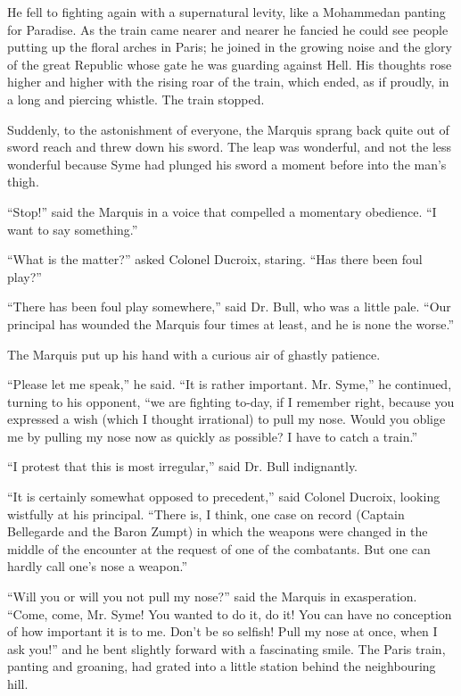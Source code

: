 \documentclass{book}
\begin{document}
He fell to fighting again with a supernatural levity, like a Mohammedan panting for Paradise. As the train came nearer and nearer he fancied he could see people putting up the floral arches in Paris; he joined in the growing noise and the glory of the great Republic whose gate he was guarding against Hell. His thoughts rose higher and higher with the rising roar of the train, which ended, as if proudly, in a long and piercing whistle. The train stopped.

Suddenly, to the astonishment of everyone, the Marquis sprang back quite out of sword reach and threw down his sword. The leap was wonderful, and not the less wonderful because Syme had plunged his sword a moment before into the man’s thigh.

“Stop!” said the Marquis in a voice that compelled a momentary obedience. “I want to say something.”

“What is the matter?” asked Colonel Ducroix, staring. “Has there been foul play?”

“There has been foul play somewhere,” said Dr. Bull, who was a little pale. “Our principal has wounded the Marquis four times at least, and he is none the worse.”

The Marquis put up his hand with a curious air of ghastly patience.

“Please let me speak,” he said. “It is rather important. Mr. Syme,” he continued, turning to his opponent, “we are fighting to-day, if I remember right, because you expressed a wish (which I thought irrational) to pull my nose. Would you oblige me by pulling my nose now as quickly as possible? I have to catch a train.”

“I protest that this is most irregular,” said Dr. Bull indignantly.

“It is certainly somewhat opposed to precedent,” said Colonel Ducroix, looking wistfully at his principal. “There is, I think, one case on record (Captain Bellegarde and the Baron Zumpt) in which the weapons were changed in the middle of the encounter at the request of one of the combatants. But one can hardly call one’s nose a weapon.”

“Will you or will you not pull my nose?” said the Marquis in exasperation. “Come, come, Mr. Syme! You wanted to do it, do it! You can have no conception of how important it is to me. Don’t be so selfish! Pull my nose at once, when I ask you!” and he bent slightly forward with a fascinating smile. The Paris train, panting and groaning, had grated into a little station behind the neighbouring hill.
\end{document}
